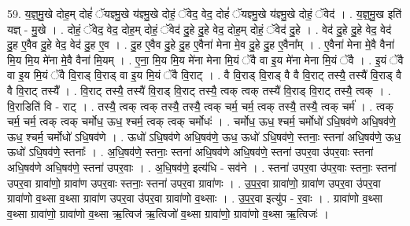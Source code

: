 \documentclass[17pt]{extarticle}
\begin{document}
59. य॒ज्ञ्॒मु॒खे दोह॒म् दोहं॑ ॅयज्ञ्मु॒खे य॑ज्ञ्मु॒खे दोहं॒ ॅवेद॒ वेद॒ दोहं॑ ॅयज्ञ्मु॒खे य॑ज्ञ्मु॒खे दोहं॒ ॅवेद॑ । . य॒ज्ञ्॒मु॒ख इति॑ यज्ञ् - मु॒खे । . दोहं॒ ॅवेद॒ वेद॒ दोह॒म् दोहं॒ ॅवेद॑ दु॒हे दु॒हे वेद॒ दोह॒म् दोहं॒ ॅवेद॑ दु॒हे । . वेद॑ दु॒हे दु॒हे वेद॒ वेद॑ दु॒ह ए॒वैव दु॒हे वेद॒ वेद॑ दु॒ह ए॒व । . दु॒ह ए॒वैव दु॒हे दु॒ह ए॒वैना॑ मेना मे॒व दु॒हे दु॒ह ए॒वैना᳚म् । . ए॒वैना॑ मेना मे॒वै वैना॑ मि॒य मि॒य मे॑ना मे॒वै वैना॑ मि॒यम् । . ए॒ना॒ मि॒य मि॒य मे॑ना मेना मि॒यं ॅवै वा इ॒य मे॑ना मेना मि॒यं ॅवै । . इ॒यं ॅवै वा इ॒य मि॒यं ॅवै वि॒राड् वि॒राड् वा इ॒य मि॒यं ॅवै वि॒राट् । . वै वि॒राड् वि॒राड् वै वै वि॒राट् तस्यै॒ तस्यै॑ वि॒राड् वै वै वि॒राट् तस्यै᳚ । . वि॒राट् तस्यै॒ तस्यै॑ वि॒राड् वि॒राट् तस्यै॒ त्वक् त्वक् तस्यै॑ वि॒राड् वि॒राट् तस्यै॒ त्वक् । . वि॒राडिति॑ वि - राट् । . तस्यै॒ त्वक् त्वक् तस्यै॒ तस्यै॒ त्वक् चर्म॒ चर्म॒ त्वक् तस्यै॒ तस्यै॒ त्वक् चर्म॑ । . त्वक् चर्म॒ चर्म॒ त्वक् त्वक् चर्मोध॒ ऊध॒ श्चर्म॒ त्वक् त्वक् चर्मोधः॑ । . चर्मोध॒ ऊध॒ श्चर्म॒ चर्मोधो॑ ऽधि॒षव॑णे अधि॒षव॑णे॒ ऊध॒ श्चर्म॒ चर्मोधो॑ ऽधि॒षव॑णे । . ऊधो॑ ऽधि॒षव॑णे अधि॒षव॑णे॒ ऊध॒ ऊधो॑ ऽधि॒षव॑णे॒ स्तनाः॒ स्तना॑ अधि॒षव॑णे॒ ऊध॒ ऊधो॑ ऽधि॒षव॑णे॒ स्तनाः᳚ । . अ॒धि॒षव॑णे॒ स्तनाः॒ स्तना॑ अधि॒षव॑णे अधि॒षव॑णे॒ स्तना॑ उपर॒वा उ॑पर॒वाः स्तना॑ अधि॒षव॑णे अधि॒षव॑णे॒ स्तना॑ उपर॒वाः । . अ॒धि॒षव॑णे॒ इत्य॑धि - सव॑ने । . स्तना॑ उपर॒वा उ॑पर॒वाः स्तनाः॒ स्तना॑ उपर॒वा ग्रावा॑णो॒ ग्रावा॑ण उपर॒वाः स्तनाः॒ स्तना॑ उपर॒वा ग्रावा॑णः । . उ॒प॒र॒वा ग्रावा॑णो॒ ग्रावा॑ण उपर॒वा उ॑पर॒वा ग्रावा॑णो व॒थ्सा व॒थ्सा ग्रावा॑ण उपर॒वा उ॑पर॒वा ग्रावा॑णो व॒थ्साः । . उ॒प॒र॒वा इत्यु॑प - र॒वाः । . ग्रावा॑णो व॒थ्सा व॒थ्सा ग्रावा॑णो॒ ग्रावा॑णो व॒थ्सा ऋ॒त्विज॑ ऋ॒त्विजो॑ व॒थ्सा ग्रावा॑णो॒ ग्रावा॑णो व॒थ्सा ऋ॒त्विजः॑ । \newline
\end{document}
